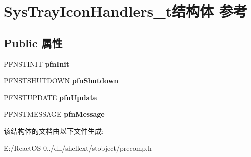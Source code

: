 \hypertarget{struct_sys_tray_icon_handlers__t}{}\section{Sys\+Tray\+Icon\+Handlers\+\_\+t结构体 参考}
\label{struct_sys_tray_icon_handlers__t}
\subsection*{Public 属性}
\begin{DoxyCompactItemize}
\item 
\mbox{\label{struct_sys_tray_icon_handlers__t_afa1a12b84c10b2b58dcd46aeaee6af5c}} 
P\+F\+N\+S\+T\+I\+N\+IT {\bfseries pfn\+Init}
\item 
\mbox{\label{struct_sys_tray_icon_handlers__t_a6f9f6ad5be98ca10e2fca951339ab9d4}} 
P\+F\+N\+S\+T\+S\+H\+U\+T\+D\+O\+WN {\bfseries pfn\+Shutdown}
\item 
\mbox{\label{struct_sys_tray_icon_handlers__t_ab09744df33a055e4710d6bfedb61d969}} 
P\+F\+N\+S\+T\+U\+P\+D\+A\+TE {\bfseries pfn\+Update}
\item 
\mbox{\label{struct_sys_tray_icon_handlers__t_a8800be8ed8c100cfe29859be76dd0603}} 
P\+F\+N\+S\+T\+M\+E\+S\+S\+A\+GE {\bfseries pfn\+Message}
\end{DoxyCompactItemize}


该结构体的文档由以下文件生成\+:\begin{DoxyCompactItemize}
\item 
E\+:/\+React\+O\+S-\/0../dll/shellext/stobject/precomp.\+h\end{DoxyCompactItemize}
